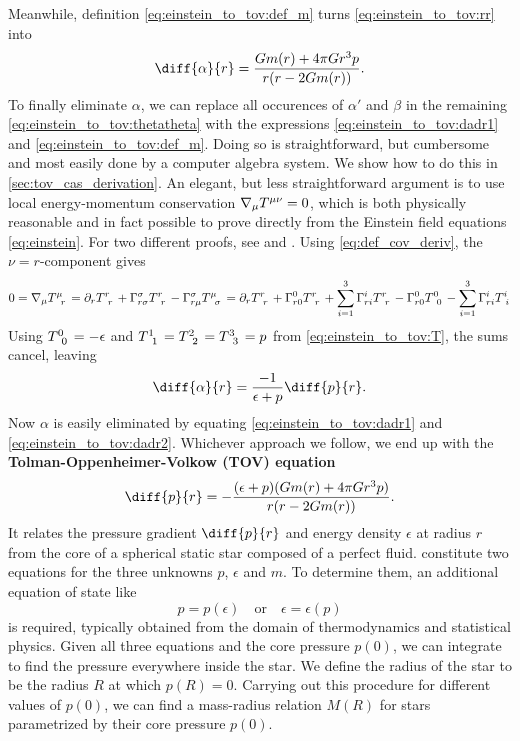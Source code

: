 \documentclass[a4paper,11pt,twoside]{report}
\begin{document}
Meanwhile, definition \eqref{eq:einstein_to_tov:def_m} turns \cref{eq:einstein_to_tov:rr} into
\begin{equation}
	\diff{\alpha}{r} = \frac{G m(r) + 4 \pi G r^3 p}{r (r - 2 G m(r))} .
	\label{eq:einstein_to_tov:dadr1}
\end{equation}
To finally eliminate $\alpha$, we can replace all occurences of $\alpha'$ and $\beta$ in the remaining \cref{eq:einstein_to_tov:thetatheta} with the expressions \eqref{eq:einstein_to_tov:dadr1} and \eqref{eq:einstein_to_tov:def_m}.
Doing so is straightforward, but cumbersome and most easily done by a computer algebra system.
We show how to do this in \cref{sec:tov_cas_derivation}.
An elegant, but less straightforward argument is to use local energy-momentum conservation $\nabla_\mu T\indices{^\mu^\nu} = 0$, which is both physically reasonable and in fact possible to prove directly from the Einstein field equations \eqref{eq:einstein}.
For two different proofs, see \cite{ref:einstein_conservation_energy_momentum} and \cite[section 8.3.2]{ref:mika_gr_notes}.
Using \cref{eq:def_cov_deriv}, the $\nu=r$-component gives
\begin{equation*}
	0
	= \nabla_\mu T\indices{^\mu_r}
	= \partial_r T\indices{^r_r} + \Gamma^\sigma_{r \sigma} T\indices{^r_r} - \Gamma^\sigma_{r \mu} T\indices{^\mu_\sigma}
	= \partial_r T\indices{^r_r} + \Gamma^0_{r0} T\indices{^r_r} + \sum_{i=1}^3 \Gamma^i_{ri} T\indices{^r_r} - \Gamma^0_{r0} T\indices{^0_0} - \sum_{i=1}^3 \Gamma^i_{ri} T\indices{^i_i}
\end{equation*}
Using $T\indices{^0_0} = -\epsilon$ and $T\indices{^1_1} = T\indices{^2_2} = T\indices{^3_3} = p$ from \cref{eq:einstein_to_tov:T}, the sums cancel, leaving
\begin{equation}
	\diff{\alpha}{r} = \frac{-1}{\epsilon+p} \diff{p}{r} .
	\label{eq:einstein_to_tov:dadr2}
\end{equation}
Now $\alpha$ is easily eliminated by equating \eqref{eq:einstein_to_tov:dadr1} and \eqref{eq:einstein_to_tov:dadr2}. 
Whichever approach we follow, we end up with the \textbf{Tolman-Oppenheimer-Volkow (TOV) equation}
\begin{equation}
	\diff{p}{r} = -\frac{(\epsilon+p) (G m(r) + 4 \pi G r^3 p)}{r (r - 2 G m(r))} .
	\label{eq:tov}
\end{equation}
It relates the pressure gradient $\diff{p}{r}$ and energy density $\epsilon$ at radius $r$ from the core of a spherical static star composed of a perfect fluid.
 constitute two equations for the three unknowns $p$, $\epsilon$ and $m$.
To determine them, an additional equation of state like
\begin{equation}
	p = p(\epsilon)
	\quad \text{or} \quad
	\epsilon = \epsilon(p)
\end{equation}
is required, typically obtained from the domain of thermodynamics and statistical physics.
Given all three equations and the core pressure $p(0)$, we can integrate to find the pressure everywhere inside the star.
We define the radius of the star to be the radius $R$ at which $p(R) = 0$.
Carrying out this procedure for different values of $p(0)$, we can find a mass-radius relation $M(R)$ for stars parametrized by their core pressure $p(0)$.
\end{document}
